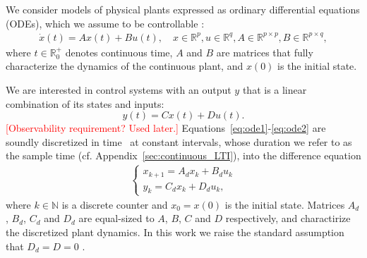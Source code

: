 \documentclass[sigconf]{llncs}
\newcommand{\mat}[1]{{#1}}
\renewcommand{\vec}[1]{{#1}}
\renewcommand{\note}[1]{\textcolor{red}{[#1]}}
\begin{document}
We consider models of physical plants expressed as ordinary differential
equations (ODEs), which we assume to be controllable \cite{Astrom08,astrom1997computer}:
%
\begin{align}
\label{eq:ode1}
\dot{x}(t) = \mat{A}\vec{x}(t)+ \mat{B} \vec{u}(t), \quad \vec{x} \in \mathbb{R}^p, \vec{u} \in \mathbb{R}^q, \mat{A} \in \mathbb{R}^{p \times p}, \mat{B} \in \mathbb{R}^{p \times q},
\end{align}
%
where $t \in \mathbb R_0^+$ denotes continuous time, 
$\mat{A}$ and $\mat{B}$ are matrices that fully characterize the dynamics of the continuous plant, 
and $x(0)$ is the initial state. 

We are interested in control systems with an output $\vec{y}$ that is a linear combination of its states and inputs:
\begin{equation}
\label{eq:ode2}  
\vec{y}(t)=\mat{C}\vec{x}(t)+\mat{D}\vec{u}(t).
\end{equation}
%
\note{Observability requirement? Used later.}
Equations~\eqref{eq:ode1}-\eqref{eq:ode2} are soundly discretized in
time~\cite{middleton1990digital,van1978computing} at constant intervals, whose 
duration we refer to as the sample time (cf. Appendix~\ref{sec:continuous_LTI}), 
into the difference equation 
\begin{align}
\label{eq:plant}
\left\{ 
\begin{array}{l}
\vec{x}_{k+1} = \mat{A}_d \vec{x}_k+ \mat{B}_d \vec{u}_k\\
\vec{y}_{k} = \mat{C}_d \vec{x}_k + \mat{D}_d \vec{u}_k, 
\end{array}
\right.
\end{align} 
%
where $k \in \mathbb N$ is a discrete counter and $\vec{x}_{0}=\vec{x}(0)$ is the initial state. 
Matrices $\mat{A}_d$, $\mat{B}_d$, $\mat{C}_d$ and $\mat{D}_d$ are equal-sized to $\mat{A}$, $\mat{B}$, $\mat{C}$ and $\mat{D}$ respectively,  
and charactirize the discretized plant dynamics. 
In this work we raise the standard assumption that $\mat{D}_d=\mat{D}=\mat{0}$ \cite{Astrom08}.  

\end{document}
